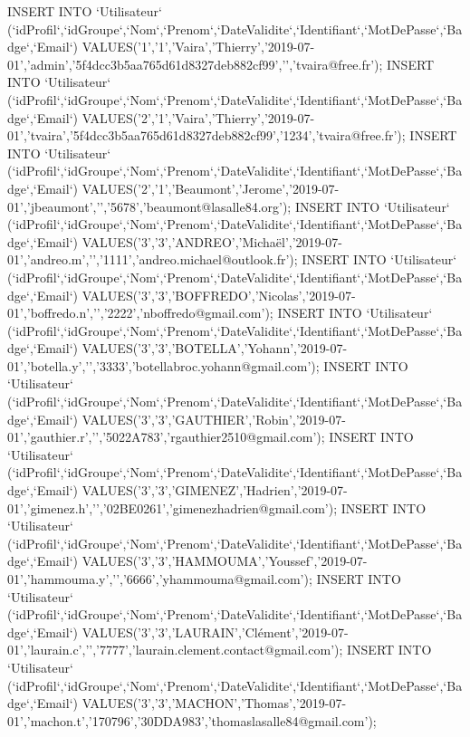 \begin{DoxyCode}
INSERT INTO `Utilisateur`
       (`idProfil`,`idGroupe`,`Nom`,`Prenom`,`DateValidite`,`Identifiant`,`MotDePasse`,`Badge`,`Email`)
       VALUES('1','1','Vaira','Thierry','2019-07-01','admin','5f4dcc3b5aa765d61d8327deb882cf99','','tvaira@free.fr');
INSERT INTO `Utilisateur`
       (`idProfil`,`idGroupe`,`Nom`,`Prenom`,`DateValidite`,`Identifiant`,`MotDePasse`,`Badge`,`Email`)
       VALUES('2','1','Vaira','Thierry','2019-07-01','tvaira','5f4dcc3b5aa765d61d8327deb882cf99','1234','tvaira@free.fr');
INSERT INTO `Utilisateur`
       (`idProfil`,`idGroupe`,`Nom`,`Prenom`,`DateValidite`,`Identifiant`,`MotDePasse`,`Badge`,`Email`)
       VALUES('2','1','Beaumont','Jerome','2019-07-01','jbeaumont','','5678','beaumont@lasalle84.org');
INSERT INTO `Utilisateur`
       (`idProfil`,`idGroupe`,`Nom`,`Prenom`,`DateValidite`,`Identifiant`,`MotDePasse`,`Badge`,`Email`)
       VALUES('3','3','ANDREO','Michaël','2019-07-01','andreo.m','','1111','andreo.michael@outlook.fr');
INSERT INTO `Utilisateur`
       (`idProfil`,`idGroupe`,`Nom`,`Prenom`,`DateValidite`,`Identifiant`,`MotDePasse`,`Badge`,`Email`)
       VALUES('3','3','BOFFREDO','Nicolas','2019-07-01','boffredo.n','','2222','nboffredo@gmail.com');
INSERT INTO `Utilisateur`
       (`idProfil`,`idGroupe`,`Nom`,`Prenom`,`DateValidite`,`Identifiant`,`MotDePasse`,`Badge`,`Email`)
       VALUES('3','3','BOTELLA','Yohann','2019-07-01','botella.y','','3333','botellabroc.yohann@gmail.com');
INSERT INTO `Utilisateur`
       (`idProfil`,`idGroupe`,`Nom`,`Prenom`,`DateValidite`,`Identifiant`,`MotDePasse`,`Badge`,`Email`)
       VALUES('3','3','GAUTHIER','Robin','2019-07-01','gauthier.r','','5022A783','rgauthier2510@gmail.com');
INSERT INTO `Utilisateur`
       (`idProfil`,`idGroupe`,`Nom`,`Prenom`,`DateValidite`,`Identifiant`,`MotDePasse`,`Badge`,`Email`)
       VALUES('3','3','GIMENEZ','Hadrien','2019-07-01','gimenez.h','','02BE0261','gimenezhadrien@gmail.com');
INSERT INTO `Utilisateur`
       (`idProfil`,`idGroupe`,`Nom`,`Prenom`,`DateValidite`,`Identifiant`,`MotDePasse`,`Badge`,`Email`)
       VALUES('3','3','HAMMOUMA','Youssef','2019-07-01','hammouma.y','','6666','yhammouma@gmail.com');
INSERT INTO `Utilisateur`
       (`idProfil`,`idGroupe`,`Nom`,`Prenom`,`DateValidite`,`Identifiant`,`MotDePasse`,`Badge`,`Email`)
       VALUES('3','3','LAURAIN','Clément','2019-07-01','laurain.c','','7777','laurain.clement.contact@gmail.com');
INSERT INTO `Utilisateur`
       (`idProfil`,`idGroupe`,`Nom`,`Prenom`,`DateValidite`,`Identifiant`,`MotDePasse`,`Badge`,`Email`)
       VALUES('3','3','MACHON','Thomas','2019-07-01','machon.t','170796','30DDA983','thomaslasalle84@gmail.com');

\end{DoxyCode}
